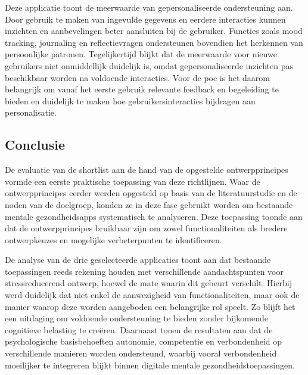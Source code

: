 Deze applicatie toont de meerwaarde van gepersonaliseerde ondersteuning aan. Door gebruik te maken van ingevulde gegevens en eerdere interacties kunnen inzichten en aanbevelingen beter aansluiten bij de gebruiker. Functies zoals mood tracking, journaling en reflectievragen ondersteunen bovendien het herkennen van persoonlijke patronen. Tegelijkertijd blijkt dat de meerwaarde voor nieuwe gebruikers niet onmiddellijk duidelijk is, omdat gepersonaliseerde inzichten pas beschikbaar worden na voldoende interacties. Voor de \acrshort{poc} is het daarom belangrijk om vanaf het eerste gebruik relevante feedback en begeleiding te bieden en duidelijk te maken hoe gebruikersinteracties bijdragen aan personalisatie.

\newpage

\subsection{Conclusie}
\label{subsec:evaluatie-conclusie}

\vspace{1em}

De evaluatie van de shortlist aan de hand van de opgestelde ontwerpprincipes vormde een eerste praktische toepassing van deze richtlijnen. Waar de ontwerpprincipes eerder werden opgesteld op basis van de literatuurstudie en de noden van de doelgroep, konden ze in deze fase gebruikt worden om bestaande mentale gezondheidsapps systematisch te analyseren. Deze toepassing toonde aan dat de ontwerpprincipes bruikbaar zijn om zowel functionaliteiten als bredere ontwerpkeuzes en mogelijke verbeterpunten te identificeren.

\vspace{1em}

De analyse van de drie geselecteerde applicaties toont aan dat bestaande toepassingen reeds rekening houden met verschillende aandachtspunten voor stressreducerend ontwerp, hoewel de mate waarin dit gebeurt verschilt. Hierbij werd duidelijk dat niet enkel de aanwezigheid van functionaliteiten, maar ook de manier waarop deze worden aangeboden een belangrijke rol speelt. Zo blijft het een uitdaging om voldoende ondersteuning te bieden zonder bijkomende cognitieve belasting te creëren. Daarnaast tonen de resultaten aan dat de psychologische basisbehoeften autonomie, competentie en verbondenheid op verschillende manieren worden ondersteund, waarbij vooral verbondenheid moeilijker te integreren blijkt binnen digitale mentale gezondheidstoepassingen.

